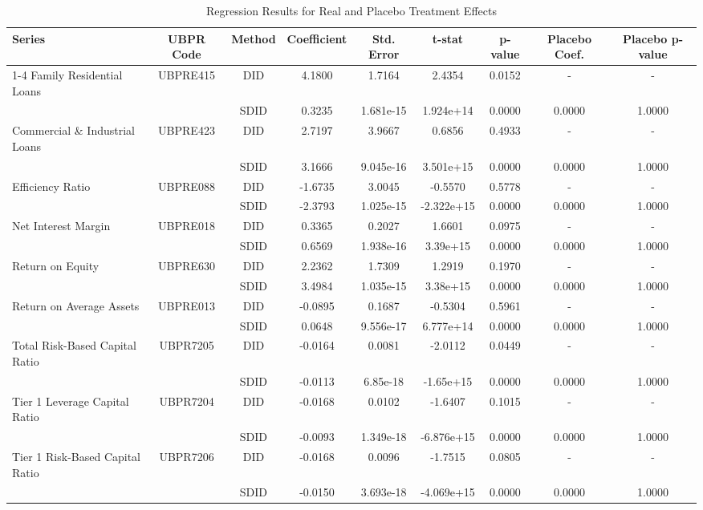 \begin{table}[htbp]
\centering
\caption{Regression Results for Real and Placebo Treatment Effects}
\label{tab:regression_results}
\begin{tabular}{lcccccccc}
\hline
Series & UBPR Code & Method & Coefficient & Std. Error & t-stat & p-value & Placebo Coef. & Placebo p-value \\
\hline
1-4 Family Residential Loans & UBPRE415 & DID & 4.1800 & 1.7164 & 2.4354 & 0.0152 & - & - \\
 &  & SDID & 0.3235 & 1.681e-15 & 1.924e+14 & 0.0000 & 0.0000 & 1.0000 \\
\hline
Commercial \& Industrial Loans & UBPRE423 & DID & 2.7197 & 3.9667 & 0.6856 & 0.4933 & - & - \\
 &  & SDID & 3.1666 & 9.045e-16 & 3.501e+15 & 0.0000 & 0.0000 & 1.0000 \\
\hline
Efficiency Ratio & UBPRE088 & DID & -1.6735 & 3.0045 & -0.5570 & 0.5778 & - & - \\
 &  & SDID & -2.3793 & 1.025e-15 & -2.322e+15 & 0.0000 & 0.0000 & 1.0000 \\
\hline
Net Interest Margin & UBPRE018 & DID & 0.3365 & 0.2027 & 1.6601 & 0.0975 & - & - \\
 &  & SDID & 0.6569 & 1.938e-16 & 3.39e+15 & 0.0000 & 0.0000 & 1.0000 \\
\hline
Return on Equity & UBPRE630 & DID & 2.2362 & 1.7309 & 1.2919 & 0.1970 & - & - \\
 &  & SDID & 3.4984 & 1.035e-15 & 3.38e+15 & 0.0000 & 0.0000 & 1.0000 \\
\hline
Return on Average Assets & UBPRE013 & DID & -0.0895 & 0.1687 & -0.5304 & 0.5961 & - & - \\
 &  & SDID & 0.0648 & 9.556e-17 & 6.777e+14 & 0.0000 & 0.0000 & 1.0000 \\
\hline
Total Risk-Based Capital Ratio & UBPR7205 & DID & -0.0164 & 0.0081 & -2.0112 & 0.0449 & - & - \\
 &  & SDID & -0.0113 & 6.85e-18 & -1.65e+15 & 0.0000 & 0.0000 & 1.0000 \\
\hline
Tier 1 Leverage Capital Ratio & UBPR7204 & DID & -0.0168 & 0.0102 & -1.6407 & 0.1015 & - & - \\
 &  & SDID & -0.0093 & 1.349e-18 & -6.876e+15 & 0.0000 & 0.0000 & 1.0000 \\
\hline
Tier 1 Risk-Based Capital Ratio & UBPR7206 & DID & -0.0168 & 0.0096 & -1.7515 & 0.0805 & - & - \\
 &  & SDID & -0.0150 & 3.693e-18 & -4.069e+15 & 0.0000 & 0.0000 & 1.0000 \\

\end{tabular}
\end{table}
